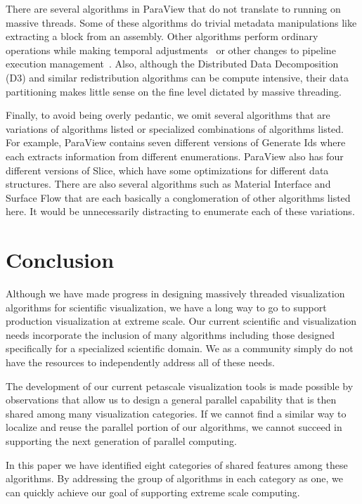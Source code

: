 \documentclass{sig-alternate}
\newcommand*{\lcite}[1]{~\cite{#1}}
\newcommand{\alg}[1]{#1}
\begin{document}
There are several algorithms in ParaView that do not translate to running
on massive threads. Some of these algorithms do trivial metadata
manipulations like extracting a block from an assembly. Other algorithms
perform ordinary operations while making temporal
adjustments\lcite{Biddiscombe2007} or other changes to pipeline execution
management\lcite{Moreland2013:TVCG}. Also, although the \alg{Distributed
  Data Decomposition} (\alg{D3}) and similar redistribution algorithms can
be compute intensive, their data partitioning makes little sense on the
fine level dictated by massive threading.

Finally, to avoid being overly pedantic, we omit several algorithms that
are variations of algorithms listed or specialized combinations of
algorithms listed. For example, ParaView contains seven different versions
of \alg{Generate Ids} where each extracts information from different
enumerations. ParaView also has four different versions of \alg{Slice},
which have some optimizations for different data structures. There are also
several algorithms such as \alg{Material Interface} and \alg{Surface Flow}
that are each basically a conglomeration of other algorithms listed here.
It would be unnecessarily distracting to enumerate each of these
variations.


\section{Conclusion}
\label{sec:Conclusion}

\noindent
Although we have made progress in designing massively threaded
visualization algorithms for scientific visualization, we have a long way
to go to support production visualization at extreme scale. Our current
scientific and visualization needs incorporate the inclusion of many
algorithms including those designed specifically for a specialized
scientific domain. We as a community simply do not have the resources to
independently address all of these needs.

The development of our current petascale visualization tools is made
possible by observations that allow us to design a general parallel
capability that is then shared among many visualization categories. If we
cannot find a similar way to localize and reuse the parallel portion of our
algorithms, we cannot succeed in supporting the next generation of parallel
computing.

In this paper we have identified eight categories of shared features among
these algorithms. By addressing the group of algorithms in each category as
one, we can quickly achieve our goal of supporting extreme scale computing.
\end{document}
